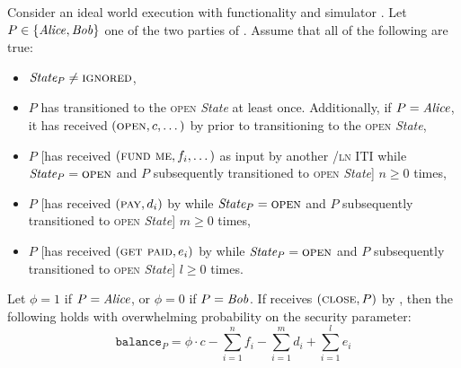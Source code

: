 \begin{lemma}
\label{lemma:ideal-balance}
  Consider an ideal world execution with functionality \fchan and simulator
  \simulator. Let $P \in \{\mathit{Alice}, \mathit{Bob}\}$ one of the two parties of \fchan.
  Assume that all of the following are true:
  \begin{itemize}
    \item $\itistate_P \neq \textsc{ignored}$,
    \item $P$ has transitioned to the \textsc{open} \textit{State} at least
    once. Additionally, if $P = \mathit{Alice}$, it has received $(\textsc{open}, c,
    \dots)$ by \environment prior to transitioning to the \textsc{open}
    \textit{State},
    \item $P$ [has received $(\textsc{fund me}, f_i, \dots)$ as input by another
    \fchan/\textsc{ln} ITI while $\itistate_P = \textsc{open}$ and $P$
    subsequently transitioned to \textsc{open} \textit{State}] $n \geq 0$ times,
    \item $P$ [has received $(\textsc{pay}, d_i)$ by \environment while
    $\itistate_P = \textsc{open}$ and $P$ subsequently transitioned to
    \textsc{open} \textit{State}] $m \geq 0$ times,
    \item $P$ [has received $(\textsc{get paid}, e_i)$ by \environment while
    $\itistate_P = \textsc{open}$ and $P$ subsequently transitioned to
    \textsc{open} \textit{State}] $l \geq 0$ times.
  \end{itemize}
  Let $\phi = 1$ if $P = \mathit{Alice}$, or $\phi = 0$ if $P = \mathit{Bob}$. If \fchan
  receives $(\textsc{close}, P)$ by \simulator, then the following holds with
  overwhelming probability on the security parameter:
  \begin{equation}
    \texttt{balance}_P = \phi \cdot c - \sum\limits_{i=1}^n f_i -
    \sum\limits_{i=1}^m d_i + \sum\limits_{i=1}^l e_i
  \end{equation}
\end{lemma}

